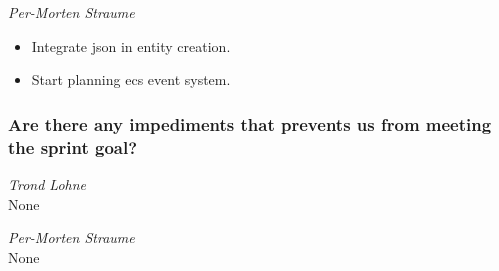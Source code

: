 \documentclass{article}
\begin{document}
\medskip

\noindent\textit{Per-Morten Straume}
\begin{itemize}
	\item 
	Integrate json in entity creation.
	
	\item 
	Start planning ecs event system.
\end{itemize}


\subsubsection*{Are there any impediments that prevents us from meeting the sprint goal?}

\noindent\textit{Trond Lohne}\\
None

\medskip

\noindent\textit{Per-Morten Straume}\\
None
\end{document}
